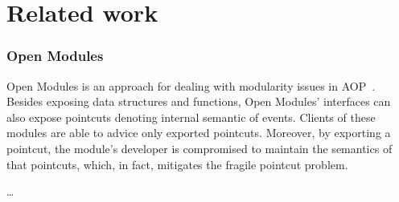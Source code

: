 \section{Related work}


\subsubsection{Open Modules}

Open Modules is an approach for dealing with modularity issues in 
AOP~\cite{aldrich-ecoop-05}. Besides exposing data structures and 
functions, Open Modules' interfaces can also expose pointcuts denoting 
internal semantic of events. Clients of these modules are able to advice 
only exported pointcuts. Moreover, by exporting a pointcut, the module's 
developer is compromised to maintain the semantics of that pointcuts, 
which, in fact, mitigates the fragile pointcut problem. 

\ldots


